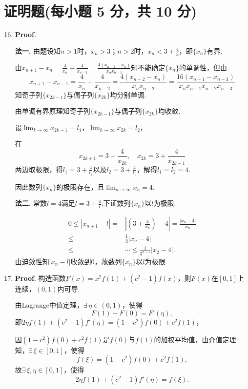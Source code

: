\documentclass[../main.tex]{subfiles}
\begin{document}
\section{证明题(每小题 5 分，共 10 分)}
\begin{enumerate}
    \setcounter{enumi}{15}
    \item \textbf{Proof}.

          \textbf{法一.} 由题设知$n>1$时，$x_{n}>3$；$n>2$时，$x_{n}<3+\frac{4}{3}$，即$\{
              x_{n}\}$有界.

          由$x_{n+1}-x_{n}=\frac{4}{x_{n}}-\frac{4}{x_{n-1}}=\frac{4(x_{n-1}-x_{n})}{x_{n}
                  x_{n-1}}$知不能确定$\{x_{n}\}$的单调性，但由
          \[
              x_{n+1}-x_{n-1}=\frac{4}{x_{n}}-\frac{4}{x_{n-2}}=\frac{4(x_{n-2}-x_{n})}{x_{n}
                  x_{n-2}}=\frac{16(x_{n-1}-x_{n-3})}{x_{n} x_{n-1}x_{n-2}x_{n-3}}
          \]
          知奇子列$\{x_{2k-1}\}$与偶子列$\{x_{2k}\}$均分别单调.

          由单调有界原理知奇子列$\{x_{2k-1}\}$与偶子列$\{x_{2k}\}$均收敛.

          设$\lim_{k\to\infty}x_{2k-1}=l_{1}$，$\lim_{k\to\infty}x_{2k}=l_{2}$，

          在
          \[
              x_{2k+1}=3+\frac{4}{x_{2k}},\quad x_{2k}=3+\frac{4}{x_{2k-1}}
          \]
          两边取极限，得$l_{1}=3+\frac{4}{l_{2}}$以及$l_{2}=3+\frac{4}{l_{1}}$，解得$l
                  _{1}=l_{2}=4$.

          因此数列$\{x_{n}\}$的极限存在，且$\lim_{n\to\infty}x_{n}=4$.

          \textbf{法二.} 常数$l=4$满足$l=3+\frac{4}{l}$.下证数列$\{x_{n}\}$以$l$为极限.

          \[
              \begin{aligned}
                  0\leq|x_{n+1}-l|= {} & \left|\left(3+\frac{4}{x_n}\right)-4\right|=\frac{|x_n-4|}{x_n} \\
                  \leq {}              & \frac{1}{3}|x_{n}-4|                                            \\
                  \leq {}              & \cdots \leq \frac{1}{3^{n-1}}|x_{2}-4|.
              \end{aligned}
          \]
          由迫敛性知$|x_{n}-l|$收敛到$0$，故数列$\{x_{n}\}$以$l$为极限.

    \item \textbf{Proof}. 构造函数$F(x)=x^{2}f(1)+(c^{2}-1)f(x)$，则$F(x)$在$[
                  0,1]$上连续，$(0,1)$内可导.

          由Lagrange中值定理，$\exists\,\eta\in(0,1)$，使得
          \[
              F(1)-F(0)=F'(\eta),
          \]
          即$2\eta f(1)+(c^{2}-1)f'(\eta)=(1-c^{2})f(0)+c^{2}f(1)$，

          因$(1-c^{2})f(0)+c^{2} f(1)$是$f(0)$与$f(1)$的加权平均值，由介值定理知，$\exists
              \,\xi\in[0,1]$，使得
          \[
              f(\xi)=(1-c^{2})f(0)+c^{2} f(1),
          \]
          故$\exists\,\xi,\eta\in[0,1]$，使得
          \[
              2\eta f(1)+(c^{2}-1)f'(\eta)=f(\xi).
          \]
\end{enumerate}
\end{document}

